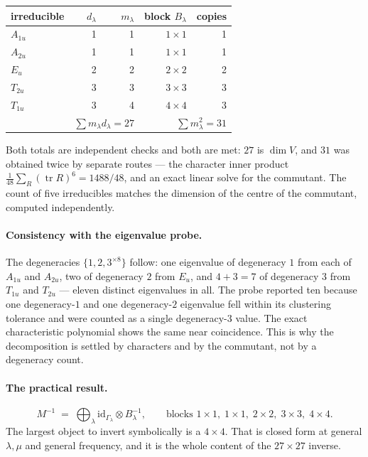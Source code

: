 \documentclass[11pt]{article}
\begin{document}
\begin{table}[h]
\centering
\begin{tabular}{lrrrr}
\toprule
irreducible & $d_\lambda$ & $m_\lambda$ & block $B_\lambda$ & copies \\
\midrule
$A_{1u}$ & 1 & 1 & $1\times1$ & 1 \\
$A_{2u}$ & 1 & 1 & $1\times1$ & 1 \\
$E_u$    & 2 & 2 & $2\times2$ & 2 \\
$T_{2u}$ & 3 & 3 & $3\times3$ & 3 \\
$T_{1u}$ & 3 & 4 & $4\times4$ & 3 \\
\midrule
 & \multicolumn{2}{r}{$\sum m_\lambda d_\lambda=27$} &
   \multicolumn{2}{r}{$\sum m_\lambda^2=31$} \\
\bottomrule
\end{tabular}
\end{table}

Both totals are independent checks and both are met: $27$ is $\dim V$, and $31$
was obtained twice by separate routes --- the character inner product
$\frac{1}{48}\sum_R(\operatorname{tr}R)^6=1488/48$, and an exact linear solve for
the commutant. The count of five irreducibles matches the dimension of the
centre of the commutant, computed independently.

\paragraph{Consistency with the eigenvalue probe.} The degeneracies
$\{1,2,3^{\times8}\}$ follow: one eigenvalue of degeneracy $1$ from each of
$A_{1u}$ and $A_{2u}$, two of degeneracy $2$ from $E_u$, and $4+3=7$ of
degeneracy $3$ from $T_{1u}$ and $T_{2u}$ --- eleven distinct eigenvalues in
all. The probe reported ten because one degeneracy-$1$ and one degeneracy-$2$
eigenvalue fell within its clustering tolerance and were counted as a single
degeneracy-$3$ value. The exact characteristic polynomial shows the same near
coincidence. This is why the decomposition is settled by characters and by the
commutant, not by a degeneracy count.

\paragraph{The practical result.}
\[
  M^{-1} \;=\; \bigoplus_\lambda \mathrm{id}_{\Gamma_\lambda}\otimes B_\lambda^{-1},
  \qquad
  \text{blocks } 1\times1,\;1\times1,\;2\times2,\;3\times3,\;4\times4 .
\]
The largest object to invert symbolically is a $4\times4$. That is closed form at
general $\lambda,\mu$ and general frequency, and it is the whole content of the
$27\times27$ inverse.
\end{document}
